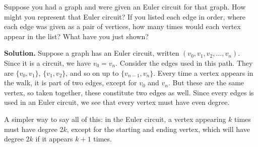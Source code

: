 \documentclass{book}
\begin{document}
\setcounter{project}{17}
\addtocounter{project}{-1}
\begin{activity}[]\label{activity-12}
\hypertarget{p-195}{}%
Suppose you had a graph and were given an Euler circuit for that graph.  How might you represent that Euler circuit?  If you listed each edge in order, where each edge was given as a pair of vertices, how many times would each vertex appear in the list?  What have you just shown?%
\par\smallskip%
\noindent\textbf{Solution.}\hypertarget{solution-12}{}\quad%
\hypertarget{p-196}{}%
Suppose a graph has an Euler circuit, written \((v_0, v_1, v_2, \ldots, v_n)\).  Since it is a circuit, we have \(v_0 = v_n\).  Consider the edges used in this path.  They are \(\{v_0, v_1\}\), \(\{v_1, v_2\}\), and so on up to \(\{v_{n-1}, v_n\}\).  Every time a vertex appears in the walk, it is part of two edges, except for \(v_0\) and \(v_n\).  But these are the same vertex, so taken together, these constitute two edges as well.  Since every edges is used in an Euler circuit, we see that every vertex must have even degree.%
\par
\hypertarget{p-197}{}%
A simpler way to say all of this: in the Euler circuit, a vertex appearing \(k\) times must have degree \(2k\), except for the starting and ending vertex, which will have degree \(2k\) if it appears \(k+1\) times.%
\end{activity}

\clearpage
\end{document}

